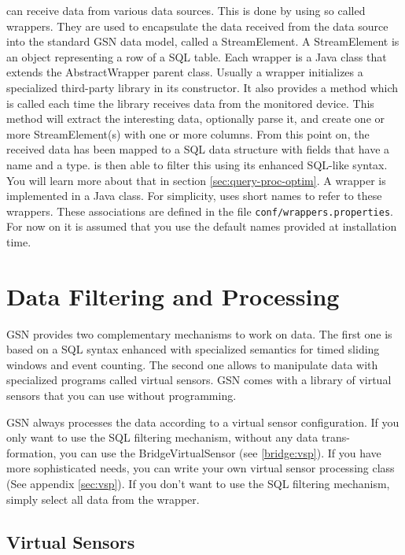 \gsn can receive data from various data sources. This is done by using so called
wrappers. They are used to encapsulate the data received from the data source
into the standard GSN data model, called a StreamElement. A StreamElement
is an object representing a row of a SQL table.
Each wrapper is a Java class that extends the AbstractWrapper parent class.
Usually a wrapper initializes a specialized third-party library in its constructor.
It also provides a method which is called each time the library receives data from
the monitored device. This method will extract the interesting data, optionally
parse it, and create one or more StreamElement(s) with one or more columns.
From this point on, the received data has been mapped to a SQL data structure
with fields that have a name and a type. \gsn is then able to filter this using
its enhanced SQL-like syntax. You will learn more about that in section \ref{sec:query-proc-optim}. 
A wrapper is implemented in a Java class. For simplicity, \gsn uses short
names to refer to these wrappers. These associations are defined in the file
\texttt{conf/wrappers.properties}. For now on it is assumed that you use the default
names provided at installation time.

\section{Data Filtering and Processing}

GSN provides two complementary mechanisms to work on data.
The first one is based on a SQL syntax enhanced with specialized semantics
for timed sliding windows and event counting.
The second one allows to manipulate data with specialized programs called
virtual sensors. GSN comes with a library of virtual sensors that you can use
without programming. 

GSN always processes the data according to a virtual sensor configuration.
If you only want to use the SQL filtering mechanism, without any data trans-
formation, you can use the BridgeVirtualSensor (see \ref{bridge:vsp}).
If you have more sophisticated needs, you can write your
own virtual sensor processing class (See appendix \ref{sec:vsp}).  If you don't want to use the SQL filtering mechanism, simply select all data
from the wrapper.

\subsection{Virtual Sensors}

